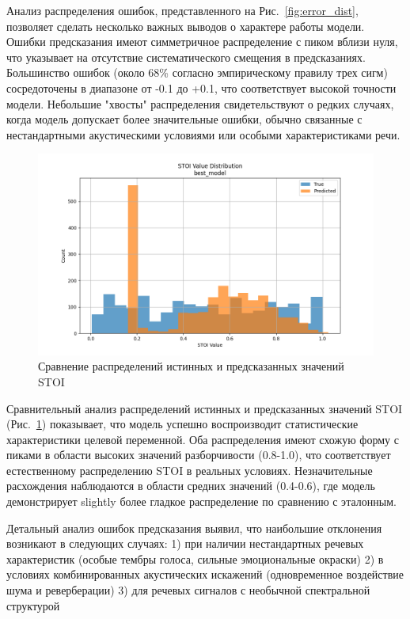 \documentclass[oneside, final, 14pt]{extarticle}
\begin{document}
Анализ распределения ошибок, представленного на Рис.~\ref{fig:error_dist}, позволяет сделать несколько важных выводов о характере работы модели. Ошибки предсказания имеют симметричное распределение с пиком вблизи нуля, что указывает на отсутствие систематического смещения в предсказаниях. Большинство ошибок (около 68\% согласно эмпирическому правилу трех сигм) сосредоточены в диапазоне от -0.1 до +0.1, что соответствует высокой точности модели. Небольшие "хвосты" распределения свидетельствуют о редких случаях, когда модель допускает более значительные ошибки, обычно связанные с нестандартными акустическими условиями или особыми характеристиками речи.

\begin{figure}[]
\centering
\includegraphics[width=1\linewidth]{best_model_stoi_dist.png}
\caption{Сравнение распределений истинных и предсказанных значений STOI}
\label{fig:stoi_dist_baseline}
\end{figure}

Сравнительный анализ распределений истинных и предсказанных значений STOI (Рис.~\ref{fig:stoi_dist_baseline}) показывает, что модель успешно воспроизводит статистические характеристики целевой переменной. Оба распределения имеют схожую форму с пиками в области высоких значений разборчивости (0.8-1.0), что соответствует естественному распределению STOI в реальных условиях. Незначительные расхождения наблюдаются в области средних значений (0.4-0.6), где модель демонстрирует slightly более гладкое распределение по сравнению с эталонным.

Детальный анализ ошибок предсказания выявил, что наибольшие отклонения возникают в следующих случаях:
1) при наличии нестандартных речевых характеристик (особые тембры голоса, сильные эмоциональные окраски)
2) в условиях комбинированных акустических искажений (одновременное воздействие шума и реверберации)
3) для речевых сигналов с необычной спектральной структурой
\end{document}
